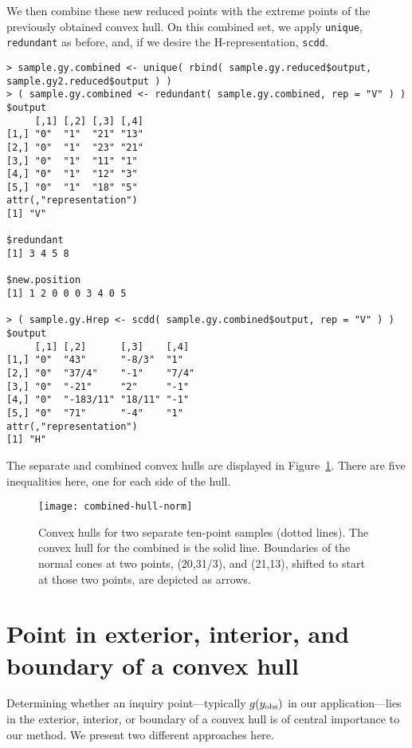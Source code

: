 We then combine these new reduced points with the extreme points of the previously
obtained convex hull.  On this combined set, we apply \texttt{unique}, 
\texttt{redundant} as before, and, if we desire the H-representation, \texttt{scdd}.
{ \singlespace
\begin{verbatim}
> sample.gy.combined <- unique( rbind( sample.gy.reduced$output, 
sample.gy2.reduced$output ) )
> ( sample.gy.combined <- redundant( sample.gy.combined, rep = "V" ) )
$output
     [,1] [,2] [,3] [,4]
[1,] "0"  "1"  "21" "13"
[2,] "0"  "1"  "23" "21"
[3,] "0"  "1"  "11" "1" 
[4,] "0"  "1"  "12" "3" 
[5,] "0"  "1"  "18" "5" 
attr(,"representation")
[1] "V"

$redundant
[1] 3 4 5 8

$new.position
[1] 1 2 0 0 0 3 4 0 5

> ( sample.gy.Hrep <- scdd( sample.gy.combined$output, rep = "V" ) )
$output
     [,1] [,2]      [,3]    [,4] 
[1,] "0"  "43"      "-8/3"  "1"  
[2,] "0"  "37/4"    "-1"    "7/4"
[3,] "0"  "-21"     "2"     "-1" 
[4,] "0"  "-183/11" "18/11" "-1" 
[5,] "0"  "71"      "-4"    "1"  
attr(,"representation")
[1] "H"
\end{verbatim}
}
The separate and combined convex hulls are displayed in Figure~\ref{F:combined-hull}.
There are five inequalities here, one for each side of the hull.
\begin{figure}[h!]
\begin{center}
\texttt{[image: combined-hull-norm]}
\end{center}
\caption[Convex hulls for two separate ten-point samples]
{Convex hulls for two separate ten-point samples (dotted lines).  The 
convex hull for the combined is the solid line.  Boundaries of the normal cones
at two points, (20,31/3), and (21,13), shifted to start at those two points, are depicted as arrows.}
\label{F:combined-hull}
\end{figure}


\section{Point in exterior, interior, and boundary of a convex hull}
Determining whether an inquiry point---typically $g(y_{\text{obs}})$ in our application---lies
 in the exterior, interior, or boundary of a convex hull is of central 
 importance to our method.  
We present two different approaches here.

